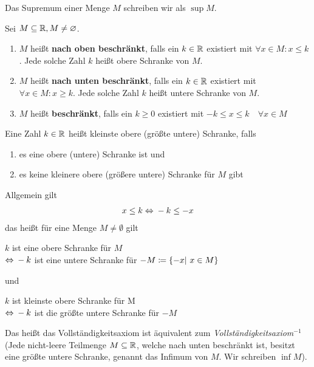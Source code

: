 \begin{notation}[Supremum]
    Das Supremum einer Menge $M$ schreiben wir als $\sup M$.
\end{notation}

\begin{definition}
    Sei $M\subseteq \mathbb{R}, M\neq \varnothing$.
    \begin{enumerate}[label=(\roman*)]
        \item $M$ heißt \textbf{nach oben beschränkt}, falls ein $k\in\mathbb{R}$ existiert mit $\forall x\in M\colon x\leq k$.
        Jede solche Zahl $k$ heißt obere Schranke von $M$.
        \item $M$ heißt \textbf{nach unten beschränkt}, falls ein $k\in\mathbb{R}$ existiert mit $\forall x\in M\colon x\geq k$.
        Jede solche Zahl $k$ heißt untere Schranke von $M$.
        \item $M$ heißt \textbf{beschränkt}, falls ein $k\geq 0$ existiert mit $-k\leq x \leq k\quad \forall x\in M$
    \end{enumerate}
\end{definition}

\begin{definition}
    Eine Zahl $k\in\mathbb{R}$ heißt kleinste obere (größte untere) Schranke, falls
    \begin{enumerate}
        \item es eine obere (untere) Schranke ist und
        \item es keine kleinere obere (größere untere) Schranke für $M$ gibt
    \end{enumerate}
\end{definition}

\begin{folgerung}
    \theoremescape
    Allgemein gilt
    \begin{align*}
        x \leq k \Leftrightarrow{} -k \leq -x
    \end{align*}
    das heißt für eine Menge $M\neq\emptyset$ gilt
    \begin{center}
        $k$ ist eine obere Schranke für $M$\\ $\Leftrightarrow{} -k$ ist eine untere Schranke für $-M\coloneqq\left\{-x|~x\in M\right\}$
    \end{center}
    und
    \begin{center}
        $k$ ist kleinste obere Schranke für M\\ $\Leftrightarrow{} -k$ ist die größte untere Schranke für $-M$
    \end{center}
    Das heißt das Vollständigkeitsaxiom ist äquivalent zum \textit{Vollständigkeitsaxiom}$^{-1}$ (Jede nicht-leere Teilmenge $M\subseteq \mathbb{R}$, welche nach unten beschränkt ist, besitzt eine größte untere Schranke, genannt das Infimum von $M$. Wir schreiben $\inf M$).
\end{folgerung}

